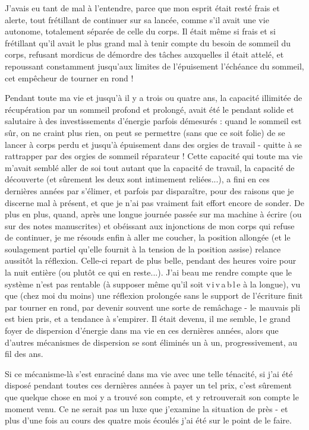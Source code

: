 
J'avais eu tant de mal à l'entendre, parce que mon esprit était resté frais et alerte, tout frétillant de continuer sur sa lancée, comme s'il avait une vie autonome, totalement séparée de celle du corps. Il était même si frais et si frétillant qu'il avait le plus grand mal à tenir compte du besoin de sommeil du corps, refusant mordicus de démordre des tâches auxquelles il était attelé, et repoussant constamment jusqu'aux limites de l'épuisement l'échéance du sommeil, cet empêcheur de tourner en rond !

Pendant toute ma vie et jusqu'à il y a trois ou quatre ans, la capacité illimitée de récupération par un sommeil profond et prolongé, avait été le pendant solide et salutaire à des investissements d'énergie parfois démesurés : quand le sommeil est sûr, on ne craint plus rien, on peut se permettre (sans que ce soit folie) de se lancer à corps perdu et jusqu'à épuisement dans des orgies de travail - quitte à se rattrapper par des orgies de sommeil réparateur ! Cette capacité qui toute ma vie m'avait semblé aller de soi tout autant que la capacité de travail, la capacité de découverte (et sûrement les deux sont intimement reliées...), a fini en ces dernières années par s'élimer, et parfois par disparaître, pour des raisons que je discerne mal à présent, et que je n'ai pas vraiment fait effort encore de sonder. De plus en plus, quand, après une longue journée passée sur ma machine à écrire (ou sur des notes manuscrites) et obéissant aux injonctions de mon corps qui refuse de continuer, je me résouds enfin à aller me coucher, la position allongée (et le soulagement partiel qu'elle fournit à la tension de la position assise) relance aussitôt la réflexion. Celle-ci repart de plus belle, pendant des heures voire pour la nuit entière (ou plutôt ce qui en reste...). J'ai beau me rendre compte que le système n'est pas rentable (à supposer même qu'il soit v\,i\,v\,a\,b\,l\,e à la longue), vu que (chez moi du moins) une réflexion prolongée sans le support de l'écriture finit par tourner en rond, par devenir souvent une sorte de remâchage - le mauvais pli est bien pris, et a tendance à s'empirer. Il était devenu, il me semble, l\,e grand foyer de dispersion d'énergie dans ma vie en ces dernières années, alors que d'autres mécanismes de dispersion se sont éliminés un à un, progressivement, au fil des ans.

Si ce mécanisme-là s'est enraciné dans ma vie avec une telle ténacité, si j'ai été disposé pendant toutes ces dernières années à payer un tel prix, c'est sûrement que quelque chose en moi y a trouvé son compte, et y retrouverait son compte le moment venu. Ce ne serait pas un luxe que j'examine la situation de près - et plus d'une fois au cours des quatre mois écoulés j'ai été sur le point de le faire.

